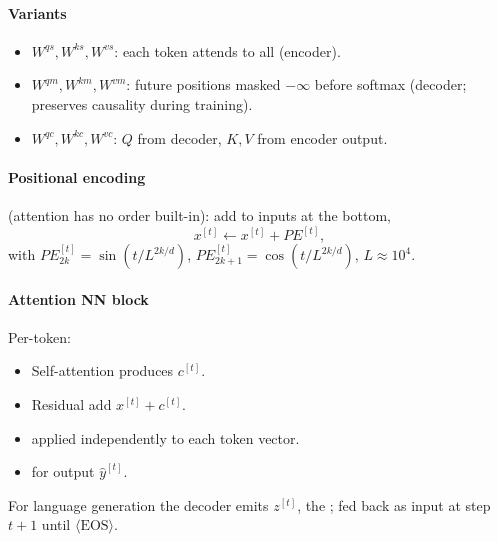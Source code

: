 \paragraph{Variants}
\begin{itemize}
\item {} $W^{qs},W^{ks},W^{vs}$: each token attends to all (encoder).
\item {} $W^{qm},W^{km},W^{vm}$: future positions masked $-\infty$ before softmax (decoder; preserves causality during training).
\item {} $W^{qc},W^{kc},W^{vc}$: $Q$ from decoder, $K,V$ from encoder output.
\end{itemize}
\paragraph{Positional encoding} (attention has no order built-in): add to inputs at the bottom,
\[x^{[t]}\leftarrow x^{[t]}+PE^{[t]},\]
with $PE^{[t]}_{2k}{=}\sin(t/L^{2k/d})$, $PE^{[t]}_{2k+1}{=}\cos(t/L^{2k/d})$, $L{\approx}10^4$.
\paragraph{Attention NN block} Per-token:
\begin{itemize}
\item Self-attention produces $c^{[t]}$.
\item Residual add $x^{[t]}{+}c^{[t]}$.
\item {} applied independently to each token vector.
\item {} for output $\hat y^{[t]}$.
\end{itemize}
 For language generation the decoder emits $z^{[t]}$, the ; fed back as input at step $t{+}1$ until $\langle\text{EOS}\rangle$.
